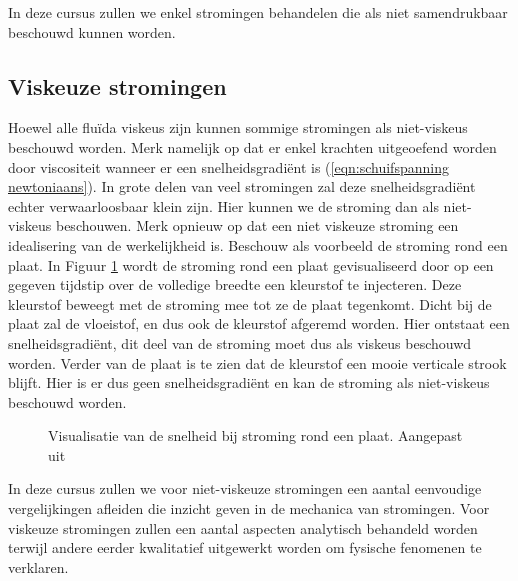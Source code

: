 In deze cursus zullen we enkel stromingen behandelen die als niet samendrukbaar beschouwd kunnen worden.

		\subsection{Viskeuze stromingen}
Hoewel alle fluïda viskeus zijn kunnen sommige stromingen als niet-viskeus beschouwd worden. Merk namelijk op dat er enkel krachten uitgeoefend worden door viscositeit wanneer er een snelheidsgradiënt is (\ref{eqn:schuifspanning newtoniaans}). In grote delen van veel stromingen zal deze snelheidsgradiënt echter verwaarloosbaar klein zijn. Hier kunnen we de stroming dan als niet-viskeus beschouwen. Merk opnieuw op dat een niet viskeuze stroming een idealisering van de werkelijkheid is. Beschouw als voorbeeld de stroming rond een plaat. In Figuur \ref{fig:grenslaag_visualisatie} wordt de stroming rond een plaat gevisualiseerd door op een gegeven tijdstip over de volledige breedte een kleurstof te injecteren. Deze kleurstof beweegt met de stroming mee tot ze de plaat tegenkomt. Dicht bij de plaat zal de vloeistof, en dus ook de kleurstof afgeremd worden. Hier ontstaat een snelheidsgradiënt, dit deel van de stroming moet dus als viskeus beschouwd worden. Verder van de plaat is te zien dat de kleurstof een mooie verticale strook blijft. Hier is er dus geen snelheidsgradiënt en kan de stroming als niet-viskeus beschouwd worden.
\begin{figure}[htb]
	\centering
	
	\caption{Visualisatie van de snelheid bij stroming rond een plaat. Aangepast uit \cite{YoutubeBoundaryLayer1966} }
	\label{fig:grenslaag_visualisatie}
\end{figure}

In deze cursus zullen we voor niet-viskeuze stromingen een aantal eenvoudige vergelijkingen afleiden die inzicht geven in de mechanica van stromingen. Voor viskeuze stromingen zullen een aantal aspecten analytisch behandeld worden terwijl andere eerder kwalitatief uitgewerkt worden om fysische fenomenen te verklaren.